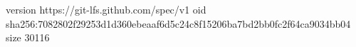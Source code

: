 version https://git-lfs.github.com/spec/v1
oid sha256:7082802f29253d1d360ebeaaf6d5c24c8f15206ba7bd2bb0fc2f64ca9034bb04
size 30116
